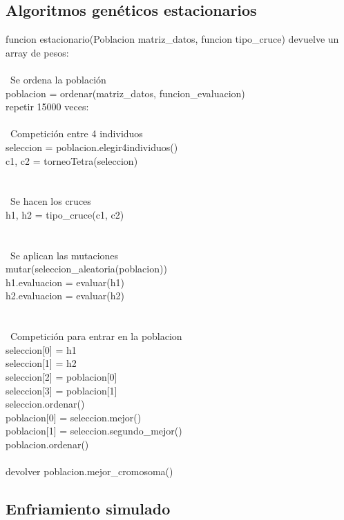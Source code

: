\documentclass[12pt, spanish]{article}
\newcommand\tab[1][1cm]{\hspace*{#1}}
\begin{document}
\subsection{Algoritmos genéticos estacionarios}
funcion estacionario(Poblacion matriz\_datos, funcion tipo\_cruce) devuelve un array de pesos:\\
 \tab  \\\ Se ordena la población\\
 \tab  poblacion = ordenar(matriz\_datos, funcion\_evaluacion) \\
\tab	 repetir 15000 veces:\\
   \tab\tab    \\\ Competición entre 4 individuos\\
  \tab \tab   seleccion = poblacion.elegir4individuos()\\
   \tab    c1, c2 = torneoTetra(seleccion)\\
\\
   \tab    \\\ Se hacen los cruces\\
      \tab h1, h2 = tipo\_cruce(c1, c2)\\
\\
     \tab  \\\ Se aplican las mutaciones\\
   \tab    mutar(seleccion\_aleatoria(poblacion))\\
    \tab   h1.evaluacion = evaluar(h1)\\
      \tab h2.evaluacion = evaluar(h2) \\
\\
\tab        \\\ Competición para entrar en la poblacion\\
   \tab    seleccion[0] = h1\\
   \tab    seleccion[1] = h2\\
    \tab   seleccion[2] = poblacion[0]\\
      \tab seleccion[3] = poblacion[1]\\
     \tab  seleccion.ordenar()\\
     \tab  poblacion[0] = seleccion.mejor()\\
     \tab  poblacion[1] = seleccion.segundo\_mejor() \\
     \tab  poblacion.ordenar() \\
\\
\tab    devolver poblacion.mejor\_cromosoma()\\
\pagebreak
\subsection{Enfriamiento simulado}
\end{document}
